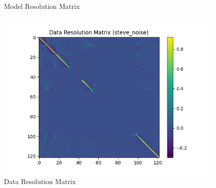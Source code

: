 \documentclass{article}
\begin{document}
\begin{itemize}
\begin{figure}[h]
        \caption{Model Resolution Matrix}
    \end{figure}
    \begin{figure}[h]
        \centering
        \includegraphics[width=1\textwidth]{images/outputs/datares/steve_noise.png}
        \caption{Data Resolution Matrix}
    \end{figure}
    \clearpage



\end{itemize}
\end{document}
